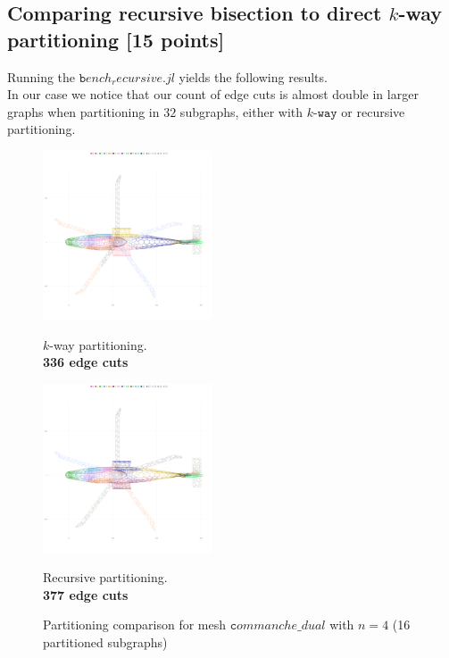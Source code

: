 \documentclass[unicode,11pt,a4paper,oneside,numbers=endperiod,openany]{scrartcl}
\begin{document}
\clearpage
\subsection{Comparing recursive bisection to direct $k$-way partitioning [15 points]}
Running the $\texttt bench_recursive.jl$ yields the following results.\\
In our case we notice that our count of edge cuts is almost double in larger graphs when partitioning in $32$ subgraphs, either with $k\texttt {-way}$ or recursive partitioning.
\begin{figure}[h!]
    \begin{minipage}{0.5\textwidth}
        \centering
        \includegraphics[height=5cm]{fig/plot/metis/metis-commanche_dual-kway-p16-cut_336.0.png}
        \caption{$k$-way partitioning.\\\textbf{336 edge cuts}}
    \end{minipage}
    \begin{minipage}{0.5\textwidth}
        \centering
        \includegraphics[height=5cm]{fig/plot/metis/metis-commanche_dual-recursive-p16-cut_377.0.png}
        \caption{Recursive partitioning.\\\textbf{377 edge cuts}}
    \end{minipage}
    \caption*{Partitioning comparison for mesh $\texttt commanche\_dual$ with $n=4$ (16 partitioned subgraphs)}
\end{figure}
\end{document}
